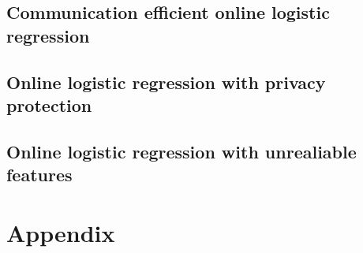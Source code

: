\documentclass{article}
\begin{document}
\subsection{Communication efficient online logistic regression}









\subsection{ Online logistic regression with privacy protection}











\subsection{Online logistic regression with unrealiable features}




















\newpage



\section*{Appendix}
\end{document}
